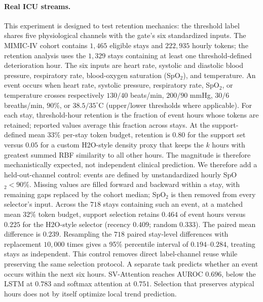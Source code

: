 \paragraph{Real ICU streams.}
This experiment is designed to test retention mechanics: the threshold label
shares five physiological channels with the gate's six standardized inputs.
The MIMIC-IV cohort contains \(1{,}465\) eligible stays and \(222{,}935\)
hourly tokens; the retention analysis uses the \(1{,}329\) stays containing at
least one threshold-defined deterioration hour. The six inputs are heart rate,
systolic and diastolic blood pressure, respiratory rate, blood-oxygen
saturation (SpO\(_2\)), and temperature. An event occurs when heart rate,
systolic pressure, respiratory rate, SpO\(_2\), or temperature crosses
respectively \(130/40\) beats/min, \(200/90\) mmHg, \(30/6\) breaths/min,
\(90\%\), or \(38.5/35^\circ\)C (upper/lower thresholds where applicable).
For each stay, threshold-hour retention is the
fraction of event hours whose tokens are retained; reported values average this
fraction across stays. At the support-defined mean \(33\%\) per-stay token
budget, retention is \(0.80\) for the support set versus \(0.05\) for a custom
H2O-style density proxy that keeps the \(k\) hours with greatest summed RBF
similarity to all other hours.
The magnitude is therefore mechanistically expected, not independent clinical
prediction. We therefore add a held-out-channel control: events are defined by
unstandardized hourly SpO\(_2<90\%\). Missing values are filled forward and
backward within a stay, with remaining gaps replaced by the cohort median;
SpO\(_2\) is then removed from every selector's input. Across the \(718\) stays
containing such an event, at a matched mean \(32\%\) token budget, support
selection retains \(0.464\) of event hours versus
\(0.225\) for the H2O-style selector (recency \(0.409\); random \(0.333\)).
The paired mean difference is \(0.239\). Resampling the \(718\) paired
stay-level differences with replacement \(10{,}000\) times gives a 95\%
percentile interval of \(0.194\)--\(0.284\), treating stays as independent.
This control removes direct label-channel reuse while preserving the same
selection protocol. A separate task predicts whether an event occurs within
the next six hours. SV-Attention reaches AUROC \(0.696\), below the LSTM at
\(0.783\) and softmax attention at \(0.751\). Selection that preserves atypical
hours does not by itself optimize local trend prediction.

